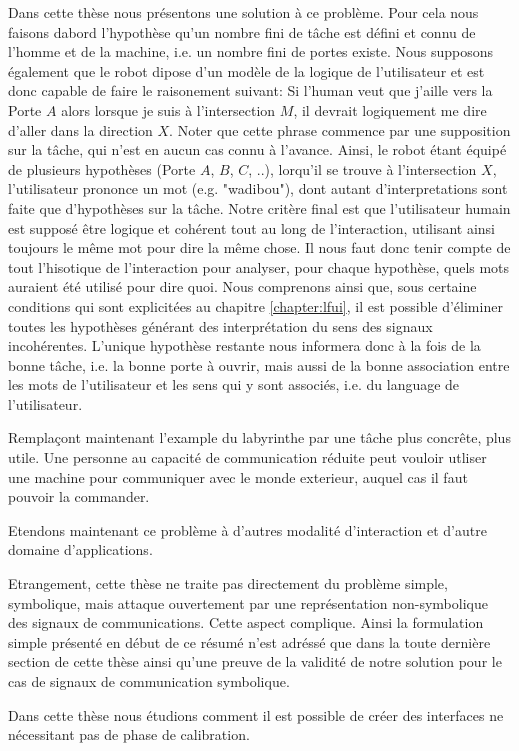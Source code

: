 Dans cette thèse nous présentons une solution à ce problème. Pour cela nous faisons dabord l'hypothèse qu'un nombre fini de tâche est défini et connu de l'homme et de la machine, i.e. un nombre fini de portes existe. Nous supposons également que le robot dipose d'un modèle de la logique de l'utilisateur et est donc capable de faire le raisonement suivant: Si l'human veut que j'aille vers la Porte $A$ alors lorsque je suis à l'intersection $M$, il devrait logiquement me dire d'aller dans la direction $X$. Noter que cette phrase commence par une supposition sur la tâche, qui n'est en aucun cas connu à l'avance. Ainsi, le robot étant équipé de plusieurs hypothèses (Porte $A$, $B$, $C$, ..), lorqu'il se trouve à l'intersection $X$, l'utilisateur prononce un mot (e.g. "wadibou"), dont autant d'interpretations sont faite que d'hypothèses sur la tâche. Notre critère final est que l'utilisateur humain est supposé être logique et cohérent tout au long de l'interaction, utilisant ainsi toujours le même mot pour dire la même chose. Il nous faut donc tenir compte de tout l'hisotique de l'interaction pour analyser, pour chaque hypothèse, quels mots auraient été utilisé pour dire quoi. Nous comprenons ainsi que, sous certaine conditions qui sont explicitées au chapitre \ref{chapter:lfui}, il est possible d'éliminer toutes les hypothèses générant des interprétation du sens des signaux incohérentes. L'unique hypothèse restante nous informera donc à la fois de la bonne tâche, i.e. la bonne porte à ouvrir, mais aussi de la bonne association entre les mots de l'utilisateur et les sens qui y sont associés, i.e. du language de l'utilisateur.

Remplaçont maintenant l'example du labyrinthe par une tâche plus concrête, plus utile. Une personne au capacité de communication réduite peut vouloir utliser une machine pour communiquer avec le monde exterieur, auquel cas il faut pouvoir la commander.

Etendons maintenant ce problème à d'autres modalité d'interaction et d'autre domaine d'applications.

Etrangement, cette thèse ne traite pas directement du problème simple, symbolique, mais attaque ouvertement par une représentation non-symbolique des signaux de communications. Cette aspect complique. Ainsi la formulation simple présenté en début de ce résumé n'est adréssé que dans la toute dernière section de cette thèse ainsi qu'une preuve de la validité de notre solution pour le cas de signaux de communication symbolique.

Dans cette thèse nous étudions comment il est possible de créer des interfaces ne nécessitant pas de phase de calibration.

